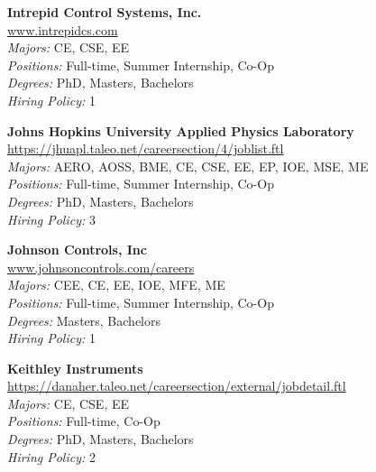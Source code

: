 \documentclass[twoside]{article}
\begin{document}
\begin{center}
\begin{multicols}{3}
\begin{minipage}{.9\columnwidth}{\Large\bf Intrepid Control Systems, Inc. }\\
	\url{www.intrepidcs.com}\\
	\emph{Majors:} CE, CSE, EE\\
	\emph{Positions:} Full-time, Summer Internship, Co-Op\\
	\emph{Degrees:} PhD, Masters, Bachelors\\
	\emph{Hiring Policy:} 1\\
\end{minipage}
 
\begin{minipage}{.9\columnwidth}{\Large\bf Johns Hopkins University Applied Physics Laboratory }\\
	\url{https://jhuapl.taleo.net/careersection/4/joblist.ftl}\\
	\emph{Majors:} AERO, AOSS, BME, CE, CSE, EE, EP, IOE, MSE, ME\\
	\emph{Positions:} Full-time, Summer Internship, Co-Op\\
	\emph{Degrees:} PhD, Masters, Bachelors\\
	\emph{Hiring Policy:} 3\\
\end{minipage}
 
\begin{minipage}{.9\columnwidth}{\Large\bf Johnson Controls, Inc }\\
	\url{www.johnsoncontrols.com/careers}\\
	\emph{Majors:} CEE, CE, EE, IOE, MFE, ME\\
	\emph{Positions:} Full-time, Summer Internship, Co-Op\\
	\emph{Degrees:} Masters, Bachelors\\
	\emph{Hiring Policy:} 1\\
\end{minipage}
 
\begin{minipage}{.9\columnwidth}{\Large\bf Keithley Instruments }\\
	\url{https://danaher.taleo.net/careersection/external/jobdetail.ftl}\\
	\emph{Majors:} CE, CSE, EE\\
	\emph{Positions:} Full-time, Co-Op\\
	\emph{Degrees:} PhD, Masters, Bachelors\\
	\emph{Hiring Policy:} 2\\
\end{minipage}
 

\end{multicols}
\end{center}
\end{document}
